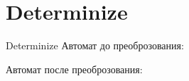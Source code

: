 \section{Determinize}
\begin{frame}{Determinize}
	Автомат до преоброзования:


	Автомат после преоброзования:

\end{frame}
